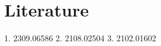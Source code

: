 \documentclass{article}
\begin{document}
\section*{Literature}
1. 2309.06586
2. 2108.02504
3. 2102.01602
\end{document}
